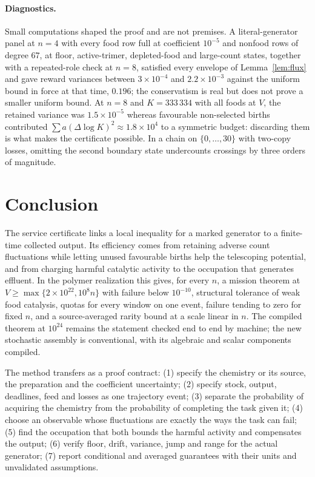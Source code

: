 \documentclass[11pt,letterpaper]{article}
\theoremstyle{plain}
\theoremstyle{definition}
\theoremstyle{remark}
\numberwithin{equation}{section}
\begin{document}
\paragraph{Diagnostics.}
Small computations shaped the proof and are not premises. A literal-generator panel at $n=4$ with every food row full at coefficient $10^{-5}$ and nonfood rows of degree $67$, at floor, active-trimer, depleted-food and large-count states, together with a repeated-role check at $n=8$, satisfied every envelope of Lemma~\ref{lem:flux} and gave reward variances between $3\times10^{-4}$ and $2.2\times10^{-3}$ against the uniform bound in force at that time, $0.196$; the conservatism is real but does not prove a smaller uniform bound. At $n=8$ and $K=333\,334$ with all foods at $V$, the retained variance was $1.5\times10^{-5}$ whereas favourable non-selected births contributed $\sum a(\Delta\log K)^2\approx1.8\times10^4$ to a symmetric budget: discarding them is what makes the certificate possible. In a chain on $\{0,\dots,30\}$ with two-copy losses, omitting the second boundary state undercounts crossings by three orders of magnitude.

\section{Conclusion}\label{sec:conclusion}

The service certificate links a local inequality for a marked generator to a finite-time collected output. Its efficiency comes from retaining adverse count fluctuations while letting unused favourable births help the telescoping potential, and from charging harmful catalytic activity to the occupation that generates effluent. In the polymer realization this gives, for every $n$, a mission theorem at $V\ge\max\{2\times10^{22},10^8n\}$ with failure below $10^{-10}$, structural tolerance of weak food catalysis, quotas for every window on one event, failure tending to zero for fixed $n$, and a source-averaged rarity bound at a scale linear in $n$. The compiled theorem at $10^{24}$ remains the statement checked end to end by machine; the new stochastic assembly is conventional, with its algebraic and scalar components compiled.

The method transfers as a proof contract: (1) specify the chemistry or its source, the preparation and the coefficient uncertainty; (2) specify stock, output, deadlines, feed and losses as one trajectory event; (3) separate the probability of acquiring the chemistry from the probability of completing the task given it; (4) choose an observable whose fluctuations are exactly the ways the task can fail; (5) find the occupation that both bounds the harmful activity and compensates the output; (6) verify floor, drift, variance, jump and range for the actual generator; (7) report conditional and averaged guarantees with their units and unvalidated assumptions.
\end{document}
